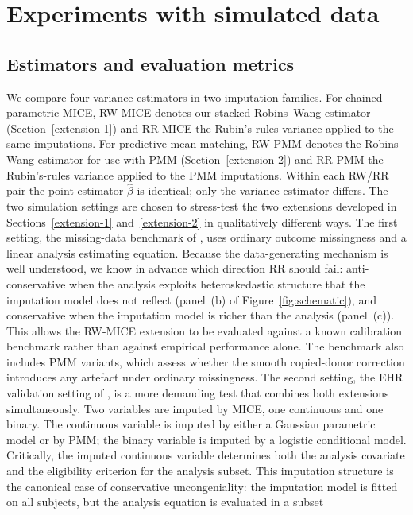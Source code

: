 \section{Experiments with simulated data}
\label{simulation-studies}
\subsection{Estimators and evaluation metrics}
\label{sim-estimators}
We compare four variance estimators in two imputation families.  For
chained parametric MICE, RW-MICE denotes our stacked Robins--Wang
estimator (Section~\ref{extension-1}) and RR-MICE the Rubin's-rules
variance applied to the same imputations.  For predictive mean matching,
RW-PMM denotes the Robins--Wang estimator for use with PMM
(Section~\ref{extension-2}) and RR-PMM the Rubin's-rules variance
applied to the PMM imputations.  Within each RW/RR pair the point
estimator \(\hat\beta\) is identical; only the variance estimator
differs.
The two simulation settings are chosen to stress-test the two extensions
developed in Sections~\ref{extension-1}
and~\ref{extension-2} in
qualitatively different ways.
The first setting, the missing-data benchmark of \citet{robins2000inference},
uses ordinary outcome missingness and a linear analysis estimating equation.
Because the data-generating mechanism is well understood, we know in advance
which direction RR should fail: anti-conservative when the analysis
exploits heteroskedastic structure that the imputation model does not reflect
(panel~(b) of Figure~\ref{fig:schematic}), and conservative when the
imputation model is richer than the analysis (panel~(c)).  This allows the RW-MICE
extension to be evaluated against a known calibration benchmark rather than against
empirical performance alone.  The benchmark also includes PMM variants, which
assess whether the smooth copied-donor correction introduces any artefact under
ordinary missingness.
The second setting, the EHR validation setting of \citet{giganti2020multiple},
is a more demanding test that combines both extensions simultaneously.  Two
variables are imputed by MICE, one continuous and one binary.  The continuous
variable is imputed by either a Gaussian parametric model or by PMM; the binary
variable is imputed by a logistic conditional model.  Critically, the imputed
continuous variable determines both the analysis covariate and the eligibility
criterion for the analysis subset.  This imputation structure is
the canonical case of conservative uncongeniality: the imputation model is
fitted on all subjects, but the analysis equation is evaluated in a subset
